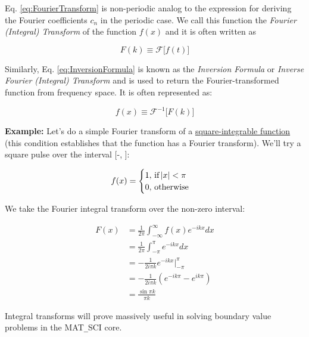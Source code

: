 Eq. \ref{eq:FourierTransform} is non-periodic analog to the expression for deriving the Fourier coefficients $c_n$ in the periodic case. We call this function the \emph{Fourier (Integral) Transform} of the function $f(x)$ and it is often written as 

\begin{equation}
F(k) \equiv \mathscr{F}\big[f(t)\big]
\label{eq:InversionFormula}
\end{equation} 

Similarly, Eq. \ref{eq:InversionFormula} is known as the \emph{Inversion Formula} or \emph{Inverse Fourier (Integral) Transform} and is used to return the Fourier-transformed function from frequency space. It is often represented as:

\begin{equation}
f(x) \equiv \mathscr{F}^{-1}\big[F(k)\big]
\end{equation} 

\begin{displayquote}
	\textbf{Example:} Let's do a simple Fourier transform of a \href{https://en.wikipedia.org/wiki/Square-integrable_function}{square-integrable function} (this condition establishes that the function has a Fourier transform). We'll try a square pulse over the interval [-\pi, \pi]:

	\begin{equation}
		f(x) =
			\begin{cases}
				1, \text{\,if\,} |x| < \pi\\
				0, \text{\,otherwise}\\
			\end{cases}
	\end{equation}

	We take the Fourier integral transform over the non-zero interval:

	\begin{align}
	F(x) &= \frac{1}{2 \pi}\int_{-\infty}^{\infty} f(x) e^{-i k x} dx\\
	&= \frac{1}{2 \pi}\int_{-\pi}^{\pi} e^{-i k x} dx\\
	&= -\frac{1}{2i \pi k} e^{-i k x}\Big|_{-\pi}^{\pi}\\
	&= -\frac{1}{2i \pi k} (e^{-i k \pi}-e^{i k \pi})\\
	&= \frac{\sin{\pi k }}{\pi k}
	\end{align}

	\end{displayquote}

Integral transforms will prove massively useful in solving boundary value problems in the MAT\texttt{\_}SCI core.


